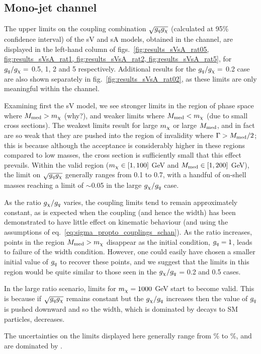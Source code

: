 \subsection{Mono-jet channel}

The upper limits on the coupling combination $\sqrt{g_q g_{\chi}}$ (calculated at 95\% confidence interval) of the sV and sA models, obtained in the \monojet channel, are displayed in the left-hand column of figs.~\ref{fig:results_sVsA_rat05, fig:results_sVsA_rat1, fig:results_sVsA_rat2, fig:results_sVsA_rat5}, for $g_q/g_{\chi} =$ 0.5, 1, 2 and 5 respectively. Additional results for the $g_q/g_{\chi} =$ 0.2 case are also shown separately in fig.~\ref{fig:results_sVsA_rat02}, as these limits are only meaningful within the \monojet channel.

Examining first the sV model, we see stronger limits in the region of phase space where $M_{\mathrm{med}} > m_{\chi}$ (why?), and weaker limits where $M_{\mathrm{med}} < m_{\chi}$ (due to small cross sections). The weakest limits result for large $m_{\chi}$ or large $M_{\mathrm{med}}$, and in fact are so weak that they are pushed into the region of invalidity where $\Gamma > M_{\mathrm{med}}/2$; this is because although the acceptance is considerably higher in these regions compared to low masses, the cross section is sufficiently small that this effect prevails. Within the valid region ($m_{\chi} \in [1, 100]$ GeV and $M_{\mathrm{med}} \in [1, 200]$ GeV), the limit on $\sqrt{g_q g_{\chi}}$ generally ranges from 0.1 to 0.7, with a handful of on-shell masses reaching a limit of $\sim$0.05 in the large $g_{\chi} / g_q$ case.

As the ratio $g_{\chi} / g_q$ varies, the coupling limits tend to remain approximately constant, as is expected when the coupling (and hence the width) has been demonstrated to have little effect on kinematic behaviour (and using the assumptions of eq.~\ref{eq:sigma_propto_couplings_schan}). As the ratio increases, points in the region $M_{\mathrm{med}} > m_{\chi}$ disappear as the initial condition, $g_q = 1$, leads to failure of the width condition. However, one could easily have chosen a smaller initial value of $g_q$ to recover these points, and we suggest that the limits in this region would be quite similar to those seen in the $g_{\chi} / g_q$ = 0.2 and 0.5 cases.

In the large ratio scenario, limits for $m_{\chi} = 1000$ GeV start to become valid. This is because if $\sqrt{g_q g_{\chi}}$ remains constant but the $g_{\chi} / g_q$ increases then the value of $g_q$ is pushed downward and so the width, which is dominated by decays to SM particles, decreases.

The uncertainties on the limits displayed here generally range from \% to \%, and are dominated by .

